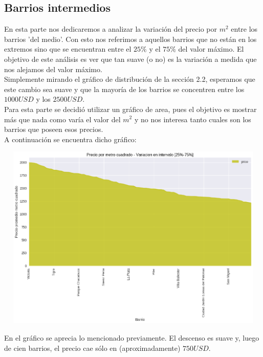 \documentclass[a4paper, 10pt]{article}
\newcommand\tab[1][0.5cm]{\hspace*{#1}}
\begin{document}
			\subsection{Barrios intermedios}
				En esta parte nos dedicaremos a analizar la variación del precio por $m^2$ entre los barrios 'del medio'. Con
				esto nos referimos a aquellos barrios que no están en los extremos sino que se encuentran entre el $25\%$ y el
				$75\%$ del valor máximo. El objetivo de este análisis es ver que tan suave (o no) es la variación a medida que
				nos alejamos del valor máximo. \\
				\tab Simplemente mirando el gráfico de distribución de la sección 2.2, esperamos que este cambio sea suave y
				que la mayoría de los barrios se concentren entre los $1000USD$ y los $2500USD$. \\
				\tab Para esta parte se decidió utilizar un gráfico de area, pues el objetivo es mostrar más que nada como
				varía el valor del $m^2$ y no nos interesa tanto cuales son los barrios que poseen esos precios. \\
				\tab A continuación se encuentra dicho gráfico: 
				\begin{center}
    					\includegraphics[width=7in, height=3.5in]{images/m2MiddleValues}
		  		\end{center}
		  		\tab  En el gráfico se aprecia lo mencionado previamente. El descenso es suave y, luego de cien barrios, 
		  		el precio cae sólo en (aproximadamente) $750USD$. \\
\end{document}

